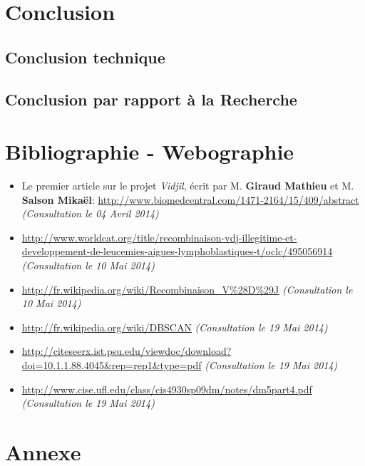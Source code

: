 \documentclass[12pt]{report}
\begin{document}
\begin{spacing}{1.2}
\chapter*{Conclusion}


\section*{Conclusion technique}

\section*{Conclusion par rapport à la Recherche}

\chapter*{Bibliographie - Webographie}


\begin{itemize}
\item{Le premier article sur le projet \textit{Vidjil}, écrit par M. \textbf{Giraud Mathieu} et M. \textbf{Salson Mikaël}: \url{http://www.biomedcentral.com/1471-2164/15/409/abstract} \textit{(Consultation le 04 Avril 2014)}}
\item{\url{http://www.worldcat.org/title/recombinaison-vdj-illegitime-et-developpement-de-leucemies-aigues-lymphoblastiques-t/oclc/495056914} \textit{(Consultation le 10 Mai 2014)}}
\item{\url{http://fr.wikipedia.org/wiki/Recombinaison_V%28D%29J} \textit{(Consultation le 10 Mai 2014)}}
\item{\url{http://fr.wikipedia.org/wiki/DBSCAN} \textit{(Consultation le 19 Mai 2014)}}
\item{\url{http://citeseerx.ist.psu.edu/viewdoc/download?doi=10.1.1.88.4045&rep=rep1&type=pdf} \textit{(Consultation le 19 Mai 2014)}}
\item{\url{http://www.cise.ufl.edu/class/cis4930sp09dm/notes/dm5part4.pdf} \textit{(Consultation le 19 Mai 2014)}}
\end{itemize}

\chapter*{Annexe}



\end{spacing}
\end{document}
